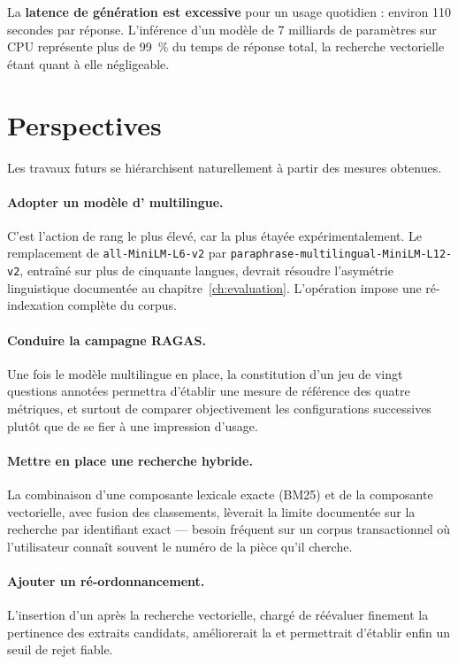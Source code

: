 La \textbf{latence de génération est excessive} pour un usage quotidien : environ
110 secondes par réponse. L'inférence d'un modèle de 7 milliards de paramètres
sur CPU représente plus de 99~\% du temps de réponse total, la recherche
vectorielle étant quant à elle négligeable.

\section*{Perspectives}

Les travaux futurs se hiérarchisent naturellement à partir des mesures obtenues.

\paragraph{Adopter un modèle d' multilingue.}
C'est l'action de rang le plus élevé, car la plus étayée expérimentalement. Le
remplacement de \texttt{all-MiniLM-L6-v2} par
\texttt{paraphrase-multilingual-MiniLM-L12-v2}, entraîné sur plus de cinquante
langues, devrait résoudre l'asymétrie linguistique documentée au
chapitre~\ref{ch:evaluation}. L'opération impose une ré-indexation complète du
corpus.

\paragraph{Conduire la campagne RAGAS.}
Une fois le modèle multilingue en place, la constitution d'un jeu de vingt
questions annotées permettra d'établir une mesure de référence des quatre
métriques, et surtout de comparer objectivement les configurations successives
plutôt que de se fier à une impression d'usage.

\paragraph{Mettre en place une recherche hybride.}
La combinaison d'une composante lexicale exacte (BM25) et de la composante
vectorielle, avec fusion des classements, lèverait la limite documentée sur la
recherche par identifiant exact --- besoin fréquent sur un corpus transactionnel
où l'utilisateur connaît souvent le numéro de la pièce qu'il cherche.

\paragraph{Ajouter un ré-ordonnancement.}
L'insertion d'un  après la recherche vectorielle, chargé de
réévaluer finement la pertinence des extraits candidats, améliorerait la
 et permettrait d'établir enfin un seuil de rejet fiable.


